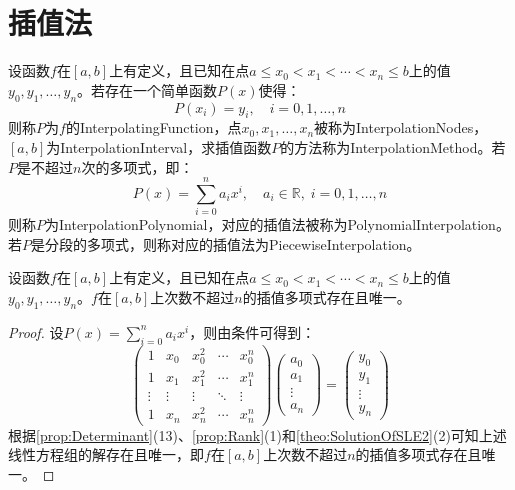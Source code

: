\section{插值法}
\begin{definition}
	设函数$f$在$[a,b]$上有定义，且已知在点$a\leqslant x_0<x_1<\cdots<x_n\leqslant b$上的值$y_0,y_1,\dots,y_n$。若存在一个简单函数$P(x)$使得：
	\begin{equation*}
		P(x_i)=y_i,\quad i=0,1,\dots,n
	\end{equation*}
	则称$P$为$f$的\gls{InterpolatingFunction}，点$x_0,x_1,\dots,x_n$被称为\gls{InterpolationNodes}，$[a,b]$为\gls{InterpolationInterval}，求插值函数$P$的方法称为\gls{InterpolationMethod}。若$P$是不超过$n$次的多项式，即：
	\begin{equation*}
		P(x)=\sum_{i=0}^{n}a_ix^i,\quad a_i\in\mathbb{R},\;i=0,1,\dots,n
	\end{equation*}
	则称$P$为\gls{InterpolationPolynomial}，对应的插值法被称为\gls{PolynomialInterpolation}。若$P$是分段的多项式，则称对应的插值法为\gls{PiecewiseInterpolation}。
\end{definition}
\begin{theorem}\label{theo:ExistenceUniquenessInterpolationPolynomial}
	设函数$f$在$[a,b]$上有定义，且已知在点$a\leqslant x_0<x_1<\cdots<x_n\leqslant b$上的值$y_0,y_1,\dots,y_n$。$f$在$[a,b]$上次数不超过$n$的插值多项式存在且唯一。
\end{theorem}
\begin{proof}
	设$P(x)=\sum\limits_{i=0}^{n}a_ix^i$，则由条件可得到：
	\begin{equation*}
		\begin{pmatrix}
			1 & x_0 & x_0^2 & \cdots & x_0^n \\
			1 & x_1 & x_1^2 & \cdots & x_1^n \\
			\vdots & \vdots & \vdots & \ddots & \vdots \\
			1 & x_n & x_n^2 & \cdots & x_n^n
		\end{pmatrix}
		\begin{pmatrix}
			a_0 \\
			a_1 \\ 
			\vdots \\ 
			a_n
		\end{pmatrix}
		=
		\begin{pmatrix}
			y_0 \\ 
			y_1 \\ 
			\vdots \\ 
			y_n
		\end{pmatrix}
	\end{equation*}
	根据\cref{prop:Determinant}(13)、\cref{prop:Rank}(1)和\cref{theo:SolutionOfSLE2}(2)可知上述线性方程组的解存在且唯一，即$f$在$[a,b]$上次数不超过$n$的插值多项式存在且唯一。
\end{proof}
